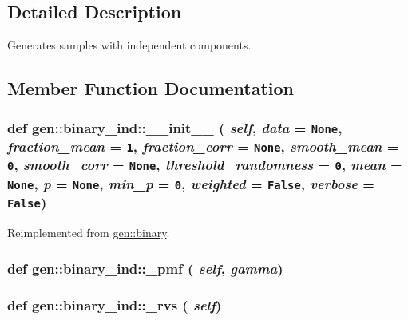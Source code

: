 \subsection{Detailed Description}
Generates samples with independent components. 

\subsection{Member Function Documentation}
\hypertarget{classgen_1_1binary__ind_d0e8fc3004c8d408ee9fa3b6839aa42e}{
\subsubsection[{\_\-\_\-init\_\-\_\-}]{\setlength{\rightskip}{0pt plus 5cm}def gen::binary\_\-ind::\_\-\_\-init\_\-\_\- ( {\em self}, \/   {\em data} = {\tt None}, \/   {\em fraction\_\-mean} = {\tt 1}, \/   {\em fraction\_\-corr} = {\tt None}, \/   {\em smooth\_\-mean} = {\tt 0}, \/   {\em smooth\_\-corr} = {\tt None}, \/   {\em threshold\_\-randomness} = {\tt 0}, \/   {\em mean} = {\tt None}, \/   {\em p} = {\tt None}, \/   {\em min\_\-p} = {\tt 0}, \/   {\em weighted} = {\tt False}, \/   {\em verbose} = {\tt False})}}
\label{classgen_1_1binary__ind_d0e8fc3004c8d408ee9fa3b6839aa42e}




Reimplemented from \hyperlink{classgen_1_1binary_705669a0b9879ed4c0f3b1d7ebac7163}{gen::binary}.\hypertarget{classgen_1_1binary__ind_a3f4f58e3d2b548ba7a6c23bde46f76a}{
\subsubsection[{\_\-pmf}]{\setlength{\rightskip}{0pt plus 5cm}def gen::binary\_\-ind::\_\-pmf ( {\em self}, \/   {\em gamma})}}
\label{classgen_1_1binary__ind_a3f4f58e3d2b548ba7a6c23bde46f76a}


\hypertarget{classgen_1_1binary__ind_dad1028ef36ee6b4263db54395168586}{
\subsubsection[{\_\-rvs}]{\setlength{\rightskip}{0pt plus 5cm}def gen::binary\_\-ind::\_\-rvs ( {\em self})}}
\label{classgen_1_1binary__ind_dad1028ef36ee6b4263db54395168586}


